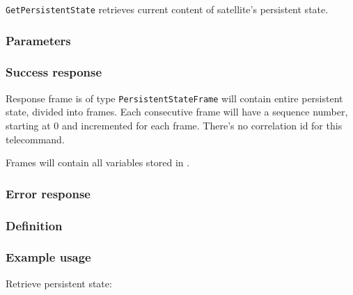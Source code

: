 \texttt{GetPersistentState} retrieves current content of satellite's persistent state. 

\subsubsection{Parameters}
\None

\subsubsection{Success response}
Response frame is of type \texttt{PersistentStateFrame} will contain entire persistent state, divided into frames. Each consecutive frame will have a sequence number, starting at 0 and incremented for each frame. There's no correlation id for this telecommand.

Frames will contain all variables stored in .

\subsubsection{Error response}
\None

\subsubsection{Definition}

\subsubsection{Example usage}
Retrieve persistent state:


